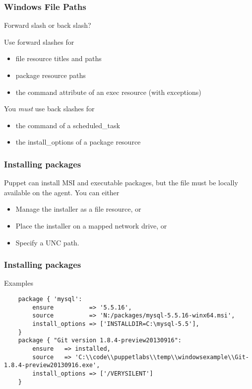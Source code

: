 \documentclass[10pt]{beamer}
\begin{document}
\begin{frame}
  \frametitle{Windows File Paths}
  
Forward slash or back slash?

Use forward slashes for 
\begin{itemize}
\item file resource titles and paths
\item package resource paths
\item the command attribute of an exec resource (with exceptions)
\end{itemize}

You \emph{must} use back slashes for 
\begin{itemize}
\item the command of a scheduled\_task
\item the install\_options of a package resource
\end{itemize}


\end{frame}

\begin{frame}
  \frametitle{Installing packages}
  
Puppet can install MSI and executable packages, but the file must be locally available on the agent.  You can either
\begin{itemize}
\item Manage the installer as a file resource, or
\item Place the installer on a mapped network drive, or
\item Specify a UNC path.
\end{itemize}
\end{frame}
\begin{frame}[fragile]
  \frametitle{Installing packages}
  Examples

  \begin{verbatim}
    package { 'mysql':
        ensure          => '5.5.16',
        source          => 'N:/packages/mysql-5.5.16-winx64.msi',
        install_options => ['INSTALLDIR=C:\mysql-5.5'],
    }
    package { "Git version 1.8.4-preview20130916":
        ensure   => installed,
        source   => 'C:\\code\\puppetlabs\\temp\\windowsexample\\Git-1.8.4-preview20130916.exe',
        install_options => ['/VERYSILENT']
    }
  \end{verbatim}



\end{frame}
\end{document}
